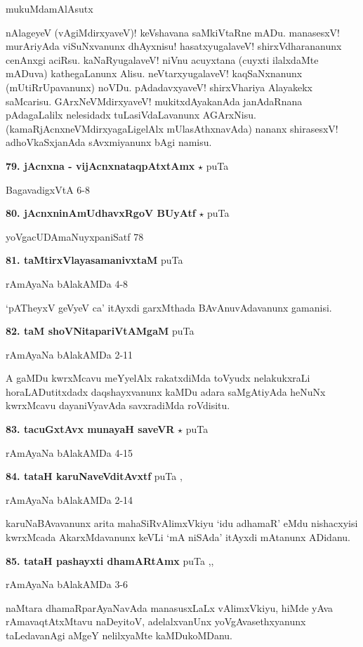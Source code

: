 \hfill mukuMdamAlAsutx

nAlageyeV (vAgiMdirxyaveV)! keVshavana saMkiVtaRne mADu. manasesxV! murAriyAda viSuNxvanunx dhAyxnisu! hasatxyugalaveV! shirxVdharananunx cenAnxgi aciRsu. kaNaRyugalaveV! niVnu acuyxtana (cuyxti ilalxdaMte mADuva) kathegaLanunx Alisu. neVtarxyugalaveV! kaqSaNxnanunx (mUtiRrUpavanunx) noVDu. pAdadavxyaveV! shirxVhariya Alayakekx saMcarisu. GArxNeVMdirxyaveV! mukitxdAyakanAda janAdaRnana pAdagaLalilx nelesidadx tuLasiVdaLavanunx AGArxNisu. (kamaRjAcnxneVMdirxyagaLigelAlx mUlasAthxnavAda) nananx shirasesxV! adhoVkaSxjanAda sAvxmiyanunx bAgi namisu.

\medskip
\noindent\textbf{79. jAcnxna - vijAcnxnataqpAtxtAmx} $\star$ \hfill puTa \pageref{66}

\hfill BagavadigxVtA 6-8

\medskip
\noindent\textbf{80. jAcnxninAmUdhavxRgoV BUyAtf} $\star$ \hfill puTa \pageref{13b}

\hfill yoVgacUDAmaNuyxpaniSatf 78

\medskip
\noindent\textbf{81. taMtirxVlayasamanivxtaM} \hfill puTa \pageref{250}

\hfill rAmAyaNa bAlakAMDa 4-8

`pATheyxV geVyeV ca' itAyxdi garxMthada BAvAnuvAdavanunx gamanisi.

\medskip
\noindent\textbf{82. taM shoVNitapariVtAMgaM} \hfill puTa \pageref{198c}

\hfill rAmAyaNa bAlakAMDa 2-11

A gaMDu kwrxMcavu meYyelAlx rakatxdiMda toVyudx nelakukxraLi horaLADutitxdadx daqshayxvanunx kaMDu adara saMgAtiyAda heNuNx kwrxMcavu dayaniVyavAda savxradiMda roVdisitu.

\medskip
\noindent\textbf{83. tacuGxtAvx munayaH saveVR} $\star$ \hfill puTa \pageref{158}

\hfill rAmAyaNa bAlakAMDa 4-15

\medskip
\noindent\textbf{84. tataH karuNaveVditAvxtf} \hfill puTa \pageref{199},\pageref{211i}

\hfill rAmAyaNa bAlakAMDa 2-14

karuNaBAvavanunx arita mahaSiRvAlimxVkiyu `idu adhamaR' eMdu nishacxyisi kwrxMcada AkarxMdavanunx keVLi `mA niSAda' itAyxdi mAtanunx ADidanu.

\medskip
\noindent\textbf{85. tataH pashayxti dhamARtAmx} \hfill puTa \pageref{204},\pageref{210a},\pageref{248}

\hfill rAmAyaNa bAlakAMDa 3-6

naMtara dhamaRparAyaNavAda manasusxLaLx vAlimxVkiyu, hiMde yAva rAmavaqtAtxMtavu naDeyitoV, adelalxvanUnx yoVgAvasethxyanunx taLedavanAgi aMgeY nelilxyaMte kaMDukoMDanu.

